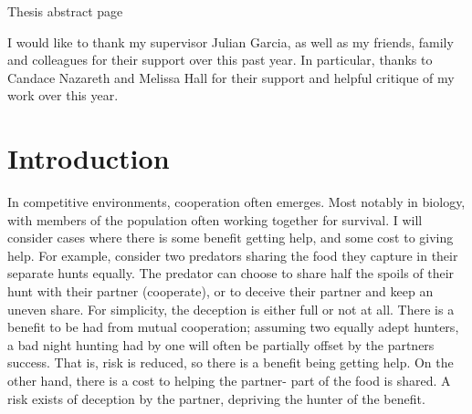 \documentclass[a4paper,11pt,bcshonoursthesis,singlespace,twoside,thesisdraft,pdflatex]{cssethesis}
\begin{document}
\frontmatter					%

\thesistitlepage				%
\thesiscopyrightpage			%
\tableofcontents				%
\listoftables					%
\listoffigures					%

\begin{thesisabstract}			%
Thesis abstract page
\end{thesisabstract}                 

\thesisdeclarationpage			%

\begin{thesisacknowledgments}	%
I would like to thank my supervisor Julian Garcia, as well as my friends, family and colleagues for their support over this past year. In particular, thanks to Candace Nazareth and Melissa Hall for their support and helpful critique of my work over this year.
\end{thesisacknowledgments}   

\mainmatter						%

\chapter{Introduction}
In competitive environments, cooperation often emerges. 
Most notably in biology, with members of the population often working together for survival. 
I will consider cases where there is some benefit getting help, and some cost to giving help. 
For example, consider two predators sharing the food they capture in their separate hunts equally. 
The predator can choose to share half the spoils of their hunt with their partner (cooperate), or to deceive their partner and keep an uneven share. 
For simplicity, the deception is either full or not at all. 
There is a benefit to be had from mutual cooperation; assuming two equally adept hunters, a bad night hunting had by one will often be partially offset by the partners success. 
That is, risk is reduced, so there is a benefit being getting help. 
On the other hand, there is a cost to helping the partner- part of the food is shared. A risk exists of deception by the partner, depriving the hunter of the benefit.  
 
\end{document}

